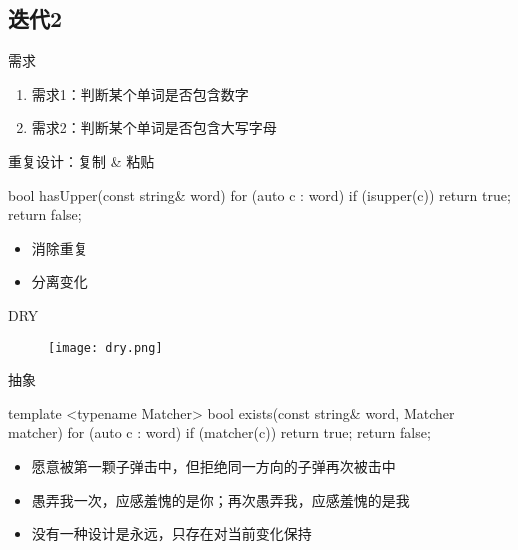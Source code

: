 \subsection{迭代2}

\begin{frame}{需求}
  \begin{block}{}
    \begin{enumerate}
    \item \alert{需求1}：判断某个单词是否包含数字
    \item<alert@1-> 需求2：判断某个单词是否包含大写字母
    \end{enumerate}
  \end{block}
\end{frame}

\begin{frame}[fragile]{重复设计：复制 \& 粘贴}
  \begin{c++}
  bool hasUpper(const string& word) {
    for (auto c : word)
      if (isupper(c))
        return true;
    return false;
  }
  \end{c++}

  \begin{itemize}
    \item \alert{消除重复}
    \item \alert{分离变化}
  \end{itemize}    
\end{frame}

\begin{frame}[fragile]{DRY}
  \begin{figure}
    \centering
    \texttt{[image: dry.png]}
  \end{figure}
\end{frame}

\begin{frame}[fragile]{抽象}
  \begin{c++}
  template <typename Matcher>
  bool exists(const string& word, Matcher matcher) {
    for (auto c : word)
      if (matcher(c))
        return true;
    return false;
  }  
  \end{c++}

  \begin{itemize}
    \item \alert{愿意被第一颗子弹击中，但拒绝同一方向的子弹再次被击中}
    \item \alert{愚弄我一次，应感羞愧的是你；再次愚弄我，应感羞愧的是我}
    \item \alert{没有一种设计是永远，只存在对当前变化保持}
  \end{itemize}
\end{frame}

